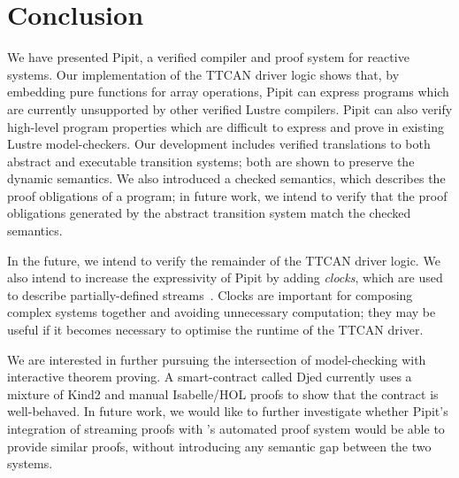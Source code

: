 
\section{Conclusion}

We have presented Pipit, a verified compiler and proof system for reactive systems.
Our implementation of the TTCAN driver logic shows that, by embedding pure \fstar{} functions for array operations, Pipit can express programs which are currently unsupported by other verified Lustre compilers.
Pipit can also verify high-level program properties which are difficult to express and prove in existing Lustre model-checkers.
Our development includes verified translations to both abstract and executable transition systems; both are shown to preserve the dynamic semantics.
We also introduced a checked semantics, which describes the proof obligations of a program; in future work, we intend to verify that the proof obligations generated by the abstract transition system match the checked semantics.

In the future, we intend to verify the remainder of the TTCAN driver logic.
We also intend to increase the expressivity of Pipit by adding \emph{clocks}, which are used to describe partially-defined streams~\cite{caspi1995functional}.
Clocks are important for composing complex systems together and avoiding unnecessary computation; they may be useful if it becomes necessary to optimise the runtime of the TTCAN driver.

We are interested in further pursuing the intersection of model-checking with interactive theorem proving.
A smart-contract called Djed \cite{zahnentferner2023djed} currently uses a mixture of Kind2 \cite{champion2016kind2} and manual Isabelle/HOL proofs to show that the contract is well-behaved.
In future work, we would like to further investigate whether Pipit's integration of streaming proofs with \fstar{}'s automated proof system would be able to provide similar proofs, without introducing any semantic gap between the two systems.

